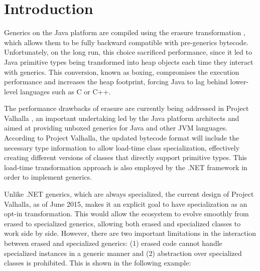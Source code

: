 \section{Introduction}
\label{sec:intro}

Generics on the Java platform are compiled using the erasure transformation \cite{java-erasure}, which allows them to be fully backward compatible with pre-generics bytecode. Unfortunately, on the long run, this choice sacrificed performance, since it led to Java primitive types being transformed into heap objects each time they interact with generics. This conversion, known as boxing, compromises the execution performance and increases the heap footprint, forcing Java to lag behind lower-level languages such as C or C++.

The performance drawbacks of erasure are currently being addressed in Project Valhalla \cite{goetz-specialization, rose-value-classes-tearing, rose-value-classes-vm}, an important undertaking led by the Java platform architects and aimed at providing unboxed generics for Java and other JVM languages. According to Project Valhalla, the updated bytecode format will include the necessary type information to allow load-time class specialization, effectively creating different versions of classes that directly support primitive types. This load-time transformation approach is also employed by the .NET framework \cite{dot-net-generics,dot-net-generics-form} in order to implement generics.


Unlike .NET generics, which are always specialized, the current design of Project Valhalla, as of June 2015, makes it an explicit goal to have specialization as an opt-in transformation. This would allow the ecosystem to evolve smoothly from erased to specialized generics, allowing both erased and specialized classes to work side by side. However, there are two important limitations in the interaction between erased and specialized generics: (1) erased code cannot handle specialized instances in a generic manner and (2) abstraction over specialized classes is prohibited. This is shown in the following example:

